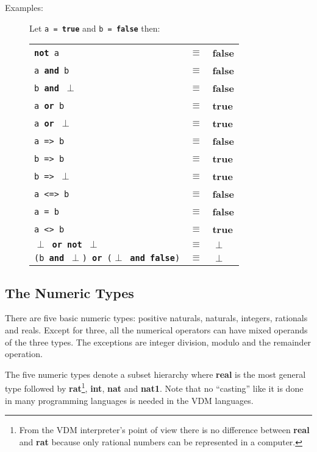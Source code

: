 \documentclass{overturerepchap}
\newcommand{\Index}[1]{#1\index{#1}}
\newcommand{\keyw}[1]{{\bf\ttfamily #1}}
\begin{document}
\begin{description}
\item[Examples:]
  Let {\tt a = \keyw{true}} and {\tt b = \keyw{false}} then:

  \begin{tabular}{lcl}
    {\tt \keyw{not} a} & $\equiv$ & \keyw{false} \\
    {\tt a \keyw{and} b} & $\equiv$ & \keyw{false} \\
    {\tt b \keyw{and} $\perp$} & $\equiv$ & \keyw{false} \\
    {\tt a \keyw{or} b} & $\equiv$ & \keyw{true} \\
    {\tt a \keyw{or} $\perp$} & $\equiv$ & \keyw{true} \\
    {\tt a => b} & $\equiv$ & \keyw{false} \\
    {\tt b => b} & $\equiv$ & \keyw{true} \\
    {\tt b => $\perp$} & $\equiv$ & \keyw{true} \\
    {\tt a <=> b} & $\equiv$ & \keyw{false} \\
    {\tt a = b} & $\equiv$ & \keyw{false} \\
    {\tt a <> b} & $\equiv$ & \keyw{true} \\
    {\tt $\perp$ \keyw{or} \keyw{not} $\perp$} & $\equiv$ & $\perp$\\
    {\tt (b \keyw{and} $\perp$) \keyw{or} ($\perp$ \keyw{and}
    \keyw{false})} & $\equiv$ & $\perp$
  \end{tabular}
\end{description}

\subsection{The Numeric Types}\label{numeric}

There are five basic numeric types: positive naturals, naturals,
integers, rationals and reals.  Except for three, all the
numerical operators can have mixed operands of the three types. The
exceptions are integer division, modulo and the remainder operation.

The five numeric types denote a subset hierarchy where \Index{\keyw{real}} is
the most general type followed by \Index{\keyw{rat}}\footnote{From the
VDM interpreter's point of view there is no
  difference between \keyw{real} and \keyw{rat} because only rational
  numbers can be represented in a computer.}, \Index{\keyw{int}},
\Index{\keyw{nat}} and \Index{\keyw{nat1}}. Note that no ``casting''
like it is done in many programming languages is needed in the VDM
languages.
\end{document}
